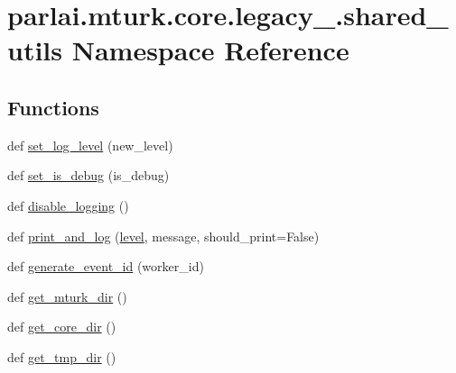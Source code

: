 \hypertarget{namespaceparlai_1_1mturk_1_1core_1_1legacy__2018_1_1shared__utils}{}\section{parlai.\+mturk.\+core.\+legacy\+\_.\+shared\+\_\+utils Namespace Reference}
\label{namespaceparlai_1_1mturk_1_1core_1_1legacy__2018_1_1shared__utils}
\subsection*{Functions}
\begin{DoxyCompactItemize}
\item 
def \hyperlink{namespaceparlai_1_1mturk_1_1core_1_1legacy__2018_1_1shared__utils_ac147fdfdeccdb0f0dbfb7528619c41c3}{set\+\_\+log\+\_\+level} (new\+\_\+level)
\item 
def \hyperlink{namespaceparlai_1_1mturk_1_1core_1_1legacy__2018_1_1shared__utils_afc61e4ad16a272bb8a3e51233596ca6e}{set\+\_\+is\+\_\+debug} (is\+\_\+debug)
\item 
def \hyperlink{namespaceparlai_1_1mturk_1_1core_1_1legacy__2018_1_1shared__utils_acff9f672edb1ac1b5b9bcd133139b4a8}{disable\+\_\+logging} ()
\item 
def \hyperlink{namespaceparlai_1_1mturk_1_1core_1_1legacy__2018_1_1shared__utils_a9ddd7de199560ccfb3565ebb85813c69}{print\+\_\+and\+\_\+log} (\hyperlink{namespaceparlai_1_1mturk_1_1core_1_1legacy__2018_1_1shared__utils_a3b6291bdf5e07c3f8ec99c7f91c03dc5}{level}, message, should\+\_\+print=False)
\item 
def \hyperlink{namespaceparlai_1_1mturk_1_1core_1_1legacy__2018_1_1shared__utils_afee39ef48ca5a78e840f508b25b57928}{generate\+\_\+event\+\_\+id} (worker\+\_\+id)
\item 
def \hyperlink{namespaceparlai_1_1mturk_1_1core_1_1legacy__2018_1_1shared__utils_ad4874994d87b965b1bc462e1d55aadd3}{get\+\_\+mturk\+\_\+dir} ()
\item 
def \hyperlink{namespaceparlai_1_1mturk_1_1core_1_1legacy__2018_1_1shared__utils_a46db6c6ce07c08b84777eaf63cf50608}{get\+\_\+core\+\_\+dir} ()
\item 
def \hyperlink{namespaceparlai_1_1mturk_1_1core_1_1legacy__2018_1_1shared__utils_a78e18954682e28ac24c8ebd529b1e5f8}{get\+\_\+tmp\+\_\+dir} ()
\end{DoxyCompactItemize}
